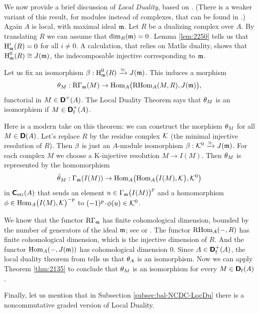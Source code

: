 \begin{rem} \label{rem:2250}
We now provide a brief discussion of {\em Local Duality}, based on 
\cite[Section V.6]{RD}. (There is a weaker variant of this result, 
for modules instead of complexes, that can be found in 
\cite[Theorem 11.2.6]{BrSh}.) Again $A$ is local, with maximal ideal $\mathfrak{m}$. 
Let $R$ be a dualizing complex over $A$. By translating $R$ we can assume that 
$\operatorname{dim}_R(\mathfrak{m}) = 0$. Lemma \ref{lem:2250} tells us that 
$\operatorname{H}^i_{\mathfrak{m}}(R) = 0$ for all $i \neq 0$. A calculation, that relies on 
Matlis duality, shows that 
$\operatorname{H}^0_{\mathfrak{m}}(R) \cong J(\mathfrak{m})$, the indecomposable injective corresponding to 
$\mathfrak{m}$. 

Let us fix an isomorphism $\beta : \operatorname{H}^0_{\mathfrak{m}}(R) \xrightarrow{\simeq} J(\mathfrak{m})$. This induces 
a morphism 
\begin{equation} \label{eqn:2260}
\theta_M : \mathrm{R} \Gamma_{\mathfrak{m}}(M) \to 
\operatorname{Hom}_A \bigl( \operatorname{RHom}_A(M, R), J(\mathfrak{m}) \bigr) ,
\end{equation}
functorial in $M \in \boldsymbol{\mathsf{D}}^+(A)$. The Local Duality Theorem
\cite[Theorem V.6.2]{RD} says that 
$\theta_M$ is an isomorphism if $M \in \boldsymbol{\mathsf{D}}^+_{\mathrm{f}}(A)$.

Here is a modern take on this theorem: we can construct the morphism $\theta_M$ 
for all $M \in \boldsymbol{\mathsf{D}}(A)$. Let's replace $R$ by the residue complex $\mathcal{K}$ 
(the minimal injective resolution of $R$). Then $\beta$ 
is just an $A$-module isomorphism $\beta : \mathcal{K}^0 \xrightarrow{\simeq} J(\mathfrak{m})$. 
For each complex $M$ we choose a K-injective resolution $M \to I(M)$.
Then $\theta_M$ is represented by the homomorphism 
\[ \tilde{\theta}_M : \Gamma_{\mathfrak{m}}(I(M)) \to 
\operatorname{Hom}_A \bigl( \operatorname{Hom}_A \bigl( I(M), \mathcal{K} \bigr), \mathcal{K}^0 \bigr) \]
in $\boldsymbol{\mathsf{C}}_{\mathrm{str}}(A)$
that sends an element $u \in \Gamma_{\mathfrak{m}} \bigl( I(M) \bigr)^p$ 
and a homomorphism 
$\phi \in \operatorname{Hom}_A \bigl( I(M), \mathcal{K} \bigr)^{-p}$
to $(-1)^p \mspace{1.5mu}{\cdot}\mspace{1.5mu} \phi(u) \in \mathcal{K}^0$. 

We know that the functor $\mathrm{R} \Gamma_{\mathfrak{m}}$ has finite cohomological 
dimension, \lb bounded by the number of generators of the ideal $\mathfrak{m}$; see 
\cite{LC} or \cite{PSY}. The functor 
$\operatorname{RHom}_{A}(-, R)$
has finite cohomological dimension, which is the injective dimension of $R$. 
And the functor 
$\operatorname{Hom}_{A}(-, J(\mathfrak{m}))$ has cohomological dimension $0$. 
Since $A \in \boldsymbol{\mathsf{D}}^+_{\mathrm{f}}(A)$, the local duality theorem from \cite{RD}
tells us that $\theta_A$ is an isomorphism. Now we can apply Theorem \ref{thm:2135}
to conclude that $\theta_M$ is an isomorphism for every 
$M \in \boldsymbol{\mathsf{D}}_{\mathrm{f}}(A)$.

Finally, let us mention that in Subsection \ref{subsec:bal-NCDC-LocDu} there is 
a noncommutative graded version of Local Duality. 
\end{rem}

